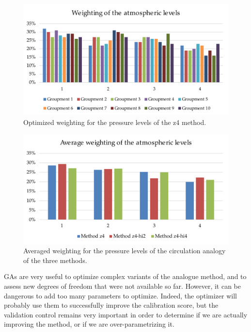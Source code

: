 \documentclass[5p]{elsarticle}
\begin{document}
\begin{figure}[htb]
	\centerline{\includegraphics[width=\linewidth]{figures/figure_levels_weights.pdf}}
	\caption{Optimized weighting for the pressure levels of the z4 method.}
	\label{fig:levels_weights}
\end{figure}

\begin{figure}[htb]
	\centerline{\includegraphics[width=\linewidth]{figures/figure_levels_weights_average.pdf}}
	\caption{Averaged weighting for the pressure levels of the circulation analogy of the three methods.}
	\label{fig:levels_weights_average}
\end{figure}

GAs are very useful to optimize complex variants of the analogue method, and to assess new degrees of freedom that were not available so far. However, it can be dangerous to add too many parameters to optimize. Indeed, the optimizer will probably use them to successfully improve the calibration score, but the validation control remains very important in order to determine if we are actually improving the method, or if we are over-parametrizing it.
\end{document}
